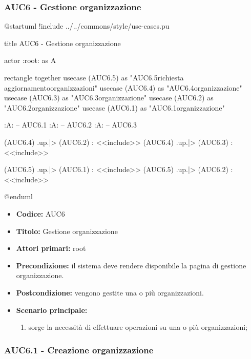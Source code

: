 \documentclass[casi-duso]{subfiles}
\begin{document}
\subsubsection{AUC6 - Gestione organizzazione}%
\label{subsub:AUC6}

\begin{plantuml}
@startuml 
!include ../../commons/style/use-cases.pu

title AUC6 - Gestione organizzazione

actor :root: as A

rectangle {
  together {
    usecase (AUC6.5) as "AUC6.5\nInvio richiesta aggiornamento\nlista organizzazioni"
    usecase (AUC6.4) as "AUC6.4\nSeleziona organizzazione"
    usecase (AUC6.3) as "AUC6.3\nModifica organizzazione"
    usecase (AUC6.2) as "AUC6.2\nEliminazione organizzazione"
    usecase (AUC6.1) as "AUC6.1\nCreazione organizzazione"
  }
}

:A: -- AUC6.1
:A: -- AUC6.2
:A: -- AUC6.3

(AUC6.4) .up.|> (AUC6.2) : <<include>>
(AUC6.4) .up.|> (AUC6.3) : <<include>>

(AUC6.5) .up.|> (AUC6.1) : <<include>>
(AUC6.5) .up.|> (AUC6.2) : <<include>>

@enduml
\end{plantuml}

\begin{itemize}
  \item \textbf{Codice:} AUC6
  \item \textbf{Titolo:} Gestione organizzazione
  \item \textbf{Attori primari:} root
  \item \textbf{Precondizione:} il sistema deve rendere disponibile la pagina di gestione organizzazione.
  \item \textbf{Postcondizione:} vengono gestite una o più organizzazioni.
  \item \textbf{Scenario principale:}
  \begin{enumerate}
    \item sorge la necessità di effettuare operazioni su una o più organizzazioni;
  \end{enumerate}
\end{itemize}

  \subsubsection{AUC6.1 - Creazione organizzazione}%
  \label{subsub:AUC6.1}
\end{document}
